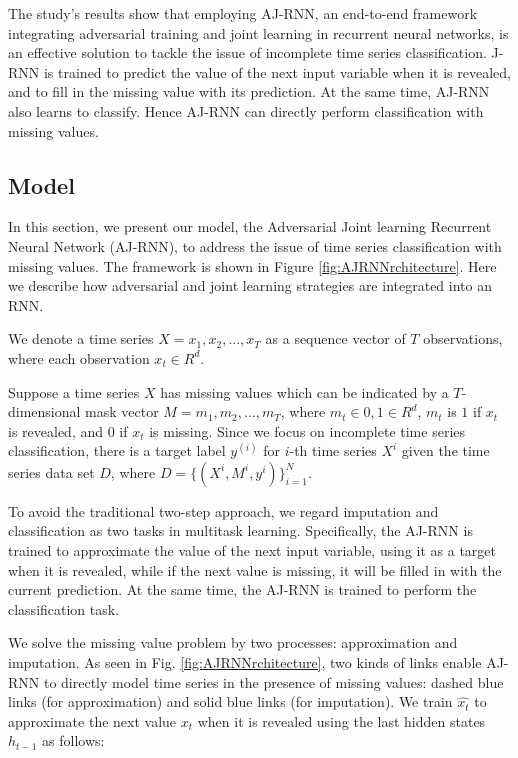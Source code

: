 The study's results show that employing AJ-RNN, an end-to-end framework integrating adversarial training and joint learning in recurrent neural networks, is an effective solution to tackle the issue of incomplete time series classification.
J-RNN is trained to predict the value of the next input variable when it is revealed, and to fill in the missing value with its prediction.
At the same time, AJ-RNN also learns to classify.
Hence AJ-RNN can directly perform classification with missing values.

\subsection{Model}


In this section, we present our model, the Adversarial Joint learning Recurrent Neural Network (AJ-RNN), to address the issue of time series classification with missing values.
The framework is shown in Figure \ref{fig:AJRNNrchitecture}. Here we describe how adversarial and joint learning strategies are integrated into an RNN.

We denote a time series $X = {x_1, x_2, ..., x_T }$ as a sequence vector of $T$ observations, where each observation $x_t \in R^d$.

Suppose a time series $X$ has missing values which can be indicated by a $T$-dimensional mask vector $M = {m_1, m_2, ..., m_T}$, where $m_t \in {0, 1} \in R^d$, $m_t$ is $1$ if $x_t$ is revealed, and $0$ if $x_t$ is missing. 
Since we focus on incomplete time series classification, there is a target label $y^{(i)}$ for $i$-th time series $X^i$ given the time series data set $D$, where $D = \{(X^i,M^i, y^i)\}^N_{i=1}$.

To avoid the traditional two-step approach, we regard imputation and classification as two tasks in multitask learning.
Specifically, the AJ-RNN is trained to approximate the value of the next input variable, using it as a target when it is revealed, while if the next value is missing, it will be filled in with the current prediction. 
At the same time, the AJ-RNN is trained to perform the classification task.

We solve the missing value problem by two processes: approximation and imputation. 
As seen in Fig. \ref{fig:AJRNNrchitecture}, two kinds of links enable AJ-RNN to directly model time series in the presence of missing values: dashed blue links (for approximation) and solid blue links (for imputation). 
We train $\hat{x_t}$ to approximate the next value $x_t$ when it is revealed using the last hidden states $h_{t-1}$ as follows:

